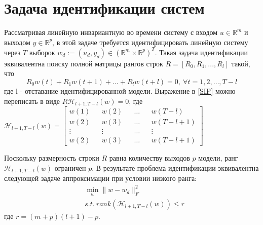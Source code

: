 \documentclass[oneside,final,14pt]{extreport} %
\begin{document}
\section{Задача идентификации систем}
Рассматривая линейную инвариантную во времени систему с входом $u \in \mathbb{R}^m$ и выходом $y \in \mathbb{R}^p$, в этой задаче требуется идентифицировать линейную систему через $T$ выборок $w_d := (u_d, y_d) \in (\mathbb{R}^m \times \mathbb{R}^p)^T$. Такая задача идентификации эквивалентна поиску полной матрицы рангов строк $R = [R_0, R_1, ..., R_l]$ такой, что
\begin{equation}
	\label{SIP}
	R_0w(t) + R_1w(t+1) + \ldots + R_lw(t+l)=0, \ \forall t = 1,2,\ldots, T-l
\end{equation}
где l - отставание идентифицированной модели. Выражение в \ref{SIP} можно переписать в виде $R \mathscr{H}_{l+1,T-l}(w) = 0$, где $\mathscr{H}_{l+1,T-l}(w) = \begin{bmatrix} w(1) && w(2) && \dots && w(T-l) \\ w(2) && w(3) && \dots && w(T-l + 1) \\ \vdots && \vdots && \dots && \vdots \\w(2) && w(3) && \dots && w(T-l + 1) \end{bmatrix}$

Поскольку размерность строки $R$ равна количеству выходов $p$ модели, ранг $\mathscr{H}_{l + 1, T - l} (w)$ ограничен $p$. В результате проблема идентификации эквивалентна следующей задаче аппроксимации при условии низкого ранга:
\begin{equation}
  \begin{aligned}
  	&\min_w \|w - w_d\|_F^2 \\ &s.t. \ rank(\mathscr{H}_{l+1, T-l}(w)) \le r
  \end{aligned}
\end{equation}
где $r = (m + p)(l + 1) - p$.

\end{document}
